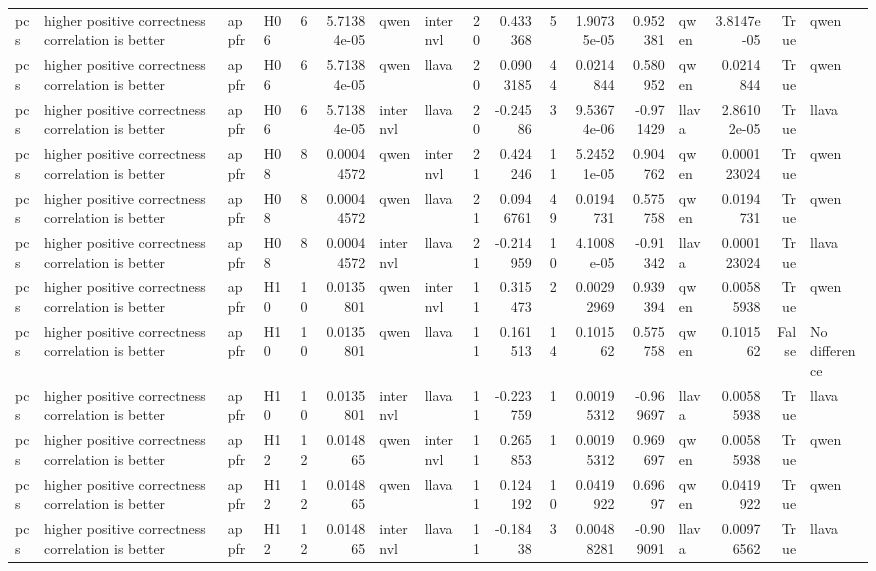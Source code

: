 \begin{longtable}{llllrrllrrrrrlrrl}
pcs & higher positive correctness correlation is better & appfr & H06 & 6 & 5.71384e-05 & qwen & internvl & 20 & 0.433368 & 5 & 1.90735e-05 & 0.952381 & qwen & 3.8147e-05 & True & qwen \\
pcs & higher positive correctness correlation is better & appfr & H06 & 6 & 5.71384e-05 & qwen & llava & 20 & 0.0903185 & 44 & 0.0214844 & 0.580952 & qwen & 0.0214844 & True & qwen \\
pcs & higher positive correctness correlation is better & appfr & H06 & 6 & 5.71384e-05 & internvl & llava & 20 & -0.24586 & 3 & 9.53674e-06 & -0.971429 & llava & 2.86102e-05 & True & llava \\
pcs & higher positive correctness correlation is better & appfr & H08 & 8 & 0.00044572 & qwen & internvl & 21 & 0.424246 & 11 & 5.24521e-05 & 0.904762 & qwen & 0.000123024 & True & qwen \\
pcs & higher positive correctness correlation is better & appfr & H08 & 8 & 0.00044572 & qwen & llava & 21 & 0.0946761 & 49 & 0.0194731 & 0.575758 & qwen & 0.0194731 & True & qwen \\
pcs & higher positive correctness correlation is better & appfr & H08 & 8 & 0.00044572 & internvl & llava & 21 & -0.214959 & 10 & 4.1008e-05 & -0.91342 & llava & 0.000123024 & True & llava \\
pcs & higher positive correctness correlation is better & appfr & H10 & 10 & 0.0135801 & qwen & internvl & 11 & 0.315473 & 2 & 0.00292969 & 0.939394 & qwen & 0.00585938 & True & qwen \\
pcs & higher positive correctness correlation is better & appfr & H10 & 10 & 0.0135801 & qwen & llava & 11 & 0.161513 & 14 & 0.101562 & 0.575758 & qwen & 0.101562 & False & No difference \\
pcs & higher positive correctness correlation is better & appfr & H10 & 10 & 0.0135801 & internvl & llava & 11 & -0.223759 & 1 & 0.00195312 & -0.969697 & llava & 0.00585938 & True & llava \\
pcs & higher positive correctness correlation is better & appfr & H12 & 12 & 0.014865 & qwen & internvl & 11 & 0.265853 & 1 & 0.00195312 & 0.969697 & qwen & 0.00585938 & True & qwen \\
pcs & higher positive correctness correlation is better & appfr & H12 & 12 & 0.014865 & qwen & llava & 11 & 0.124192 & 10 & 0.0419922 & 0.69697 & qwen & 0.0419922 & True & qwen \\
pcs & higher positive correctness correlation is better & appfr & H12 & 12 & 0.014865 & internvl & llava & 11 & -0.18438 & 3 & 0.00488281 & -0.909091 & llava & 0.00976562 & True & llava \\

\end{longtable}
